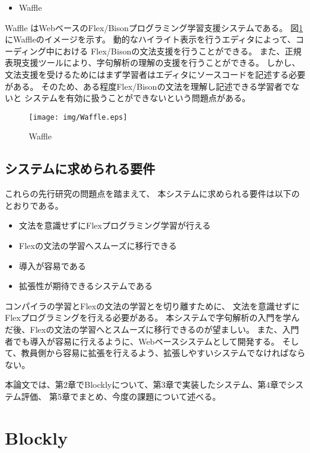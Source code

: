 \documentclass{risepaper}
\begin{document}
\begin{itemize}
\item Waffle
\end{itemize}

Waffle \cite{Thesis04,Thesis05}はWebベースのFlex/Bisonプログラミング学習支援システムである。
図\ref{fig:Waffle}にWaffleのイメージを示す。
動的なハイライト表示を行うエディタによって、コーディング中における
Flex/Bisonの文法支援を行うことができる。
また、正規表現支援ツールにより、字句解析の理解の支援を行うことができる。
しかし、文法支援を受けるためにはまず学習者はエディタにソースコードを記述する必要がある。
そのため、ある程度Flex/Bisonの文法を理解し記述できる学習者でないと
システムを有効に扱うことができないという問題点がある。

\newpage

\begin{figure}[h]
\begin{center}
\texttt{[image: img/Waffle.eps]}
\caption{Waffle}%
\label{fig:Waffle}
\end{center}%
\end{figure}%

\section{システムに求められる要件}

これらの先行研究の問題点を踏まえて、
本システムに求められる要件は以下のとおりである。
\begin{itemize}
\item 文法を意識せずにFlexプログラミング学習が行える
\item Flexの文法の学習へスムーズに移行できる
\item 導入が容易である
\item 拡張性が期待できるシステムである
\end{itemize}

コンパイラの学習とFlexの文法の学習とを切り離すために、
文法を意識せずにFlexプログラミングを行える必要がある。
本システムで字句解析の入門を学んだ後、Flexの文法の学習へとスムーズに移行できるのが望ましい。
また、入門者でも導入が容易に行えるように、Webベースシステムとして開発する。
そして、教員側から容易に拡張を行えるよう、拡張しやすいシステムでなければならない。

本論文では、第2章でBlocklyについて、第3章で実装したシステム、第4章でシステム評価、
第5章でまとめ、今度の課題について述べる。

\chapter{Blockly}
\end{document}
